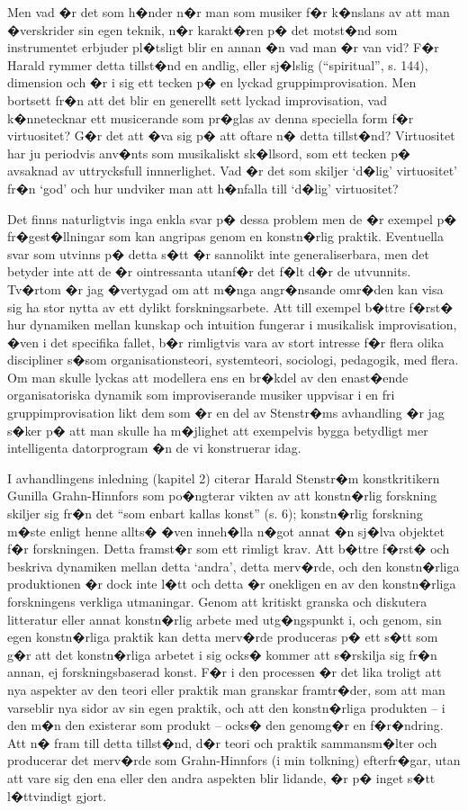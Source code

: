 \documentclass[a4paper]{article}
\begin{document}
Men vad �r det som h�nder n�r man som musiker f�r k�nslans av att man �verskrider sin egen teknik, n�r karakt�ren p� det motst�nd som instrumentet erbjuder pl�tsligt blir en annan �n vad man �r van vid? F�r Harald rymmer detta tillst�nd en andlig, eller sj�lslig (``spiritual'', s. 144), dimension och �r i sig ett tecken p� en lyckad gruppimprovisation. Men bortsett fr�n att det blir en generellt sett lyckad improvisation, vad k�nnetecknar ett musicerande som pr�glas av denna speciella form f�r virtuositet? G�r det att �va sig p� att oftare n� detta tillst�nd? Virtuositet har ju periodvis anv�nts som musikaliskt sk�llsord, som ett tecken p� avsaknad av uttrycksfull innnerlighet. Vad �r det som skiljer `d�lig' virtuositet' fr�n `god' och hur undviker man att h�nfalla till `d�lig' virtuositet?

Det finns naturligtvis inga enkla svar p� dessa problem men de �r exempel p� fr�gest�llningar som kan angripas genom en konstn�rlig praktik. Eventuella svar som utvinns p� detta s�tt �r sannolikt inte generaliserbara, men det betyder inte att de �r ointressanta utanf�r det f�lt d�r de utvunnits. Tv�rtom �r jag �vertygad om att m�nga angr�nsande omr�den kan visa sig ha stor nytta av ett dylikt forskningsarbete. Att till exempel b�ttre f�rst� hur dynamiken mellan kunskap och intuition fungerar i musikalisk improvisation, �ven i det specifika fallet, b�r rimligtvis vara av stort intresse f�r flera olika discipliner s�som organisationsteori, systemteori, sociologi, pedagogik, med flera. Om man skulle lyckas att modellera ens en br�kdel av den enast�ende organisatoriska dynamik som improviserande musiker uppvisar i en fri gruppimprovisation likt dem som �r en del av Stenstr�ms avhandling �r jag s�ker p� att man skulle ha m�jlighet att exempelvis bygga betydligt mer intelligenta datorprogram �n de vi konstruerar idag.

I avhandlingens inledning (kapitel 2) citerar Harald Stenstr�m konstkritikern Gunilla Grahn-Hinnfors som po�ngterar vikten av att konstn�rlig forskning skiljer sig fr�n det ``som enbart kallas konst'' (s. 6); konstn�rlig forskning m�ste enligt henne allts� �ven inneh�lla n�got annat �n sj�lva objektet f�r forskningen. Detta framst�r som ett  rimligt krav. Att b�ttre f�rst� och beskriva dynamiken mellan detta `andra', detta merv�rde, och den konstn�rliga produktionen �r dock inte l�tt och detta �r onekligen en av den konstn�rliga forskningens verkliga utmaningar. Genom att kritiskt granska och diskutera litteratur eller annat konstn�rlig arbete med utg�ngspunkt i, och genom, sin egen konstn�rliga praktik kan detta merv�rde produceras p� ett s�tt som g�r att det konstn�rliga arbetet i sig ocks� kommer att s�rskilja sig fr�n annan, ej forskningsbaserad konst. F�r i den processen �r det lika troligt att nya aspekter av den teori eller praktik man granskar framtr�der, som att man varseblir nya sidor av sin egen praktik, och att den konstn�rliga produkten -- i den m�n den existerar som produkt -- ocks� den genomg�r en f�r�ndring. Att n� fram till detta tillst�nd, d�r teori och praktik sammansm�lter och producerar det merv�rde som Grahn-Hinnfors (i min tolkning) efterfr�gar, utan att vare sig den ena eller den andra aspekten blir lidande, �r p� inget s�tt l�ttvindigt gjort. 
\end{document}
